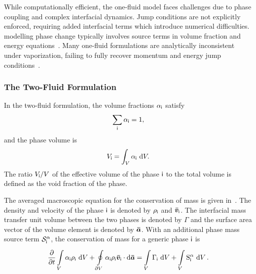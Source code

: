 While computationally efficient, the one-fluid model faces challenges due to 
 phase coupling and complex interfacial dynamics. Jump conditions are not explicitly enforced, 
 requiring added interfacial terms which introduce numerical difficulties. modelling phase 
 change typically involves source terms in volume fraction and energy 
 equations~\cite{hardtEvaporationModelInterfacial2008,tryggvasonDirectNumericalSimulations2011}. Many 
 one-fluid formulations are analytically inconsistent under vaporization, failing to fully recover 
 momentum and energy jump conditions~\cite{trujilloReexaminingOnefluidFormulation2021}. %

\subsubsection{The Two-Fluid Formulation}\label{sec:two-fluid}
In the two-fluid formulation, the volume fractions \(\alpha_{\mathsf {i}}\) satisfy
\begin{equation}
  \sum_{\mathsf {i}} \alpha_{\mathsf {i}} = 1,
\end{equation}
and the phase volume is
\begin{equation}
  V_{\mathsf {i}} = \int_V \alpha_{\mathsf {i}} \, \mathop{}\!\mathrm{d}{V}.
\end{equation}
 The ratio \(V_{\mathsf {i}}/V\) of the effective volume of the phase \(\mathsf {i}\) to the total volume is defined as 
 the void fraction of the phase. 
 
The averaged macroscopic equation for the conservation of mass is given in~.
 The density and velocity of the phase \(\mathsf {i}\) is denoted by \(\rho_{\mathsf {i}}\) and \(\bm{\bar{v}}_{\mathsf {i}}\).
 The interfacial mass transfer unit volume between the two phases is denoted
 by \(\Gamma\) and the surface area vector of the 
 volume element is denoted by \(\bm{\bar{a}}\). With an additional phase mass source term \(\mathcal{S}_{\mathsf {i}}^{\alpha}\),
 the conservation of mass for a generic phase \(\mathsf {i}\) is 
 \begin{equation}\label{eq:emp-mass}
\displaystyle\frac{\partial{}}{\partial{t}}
\displaystyle\int\limits_{V}^{} \alpha_{\mathsf {i}} \rho_{\mathsf {i}} \,\mathop{}\!\mathrm{d}{V}
+ \displaystyle\oint\limits_{\partial V}^{} \alpha_{\mathsf {i}} \rho_{\mathsf {i}} \bm{\bar{v}}_{\mathsf {i}} \cdot \mathop{}\!\mathrm{d}{\bm{\bar{a}}} = 
\displaystyle\int\limits_{V}^{} \Gamma_{\mathsf {i}} \,\mathop{}\!\mathrm{d}{V}
+ \displaystyle\int\limits_{V}^{} \mathrm{S}^{\alpha}_{\mathsf {i}} \,\mathop{}\!\mathrm{d}{V}\,.
\end{equation}

